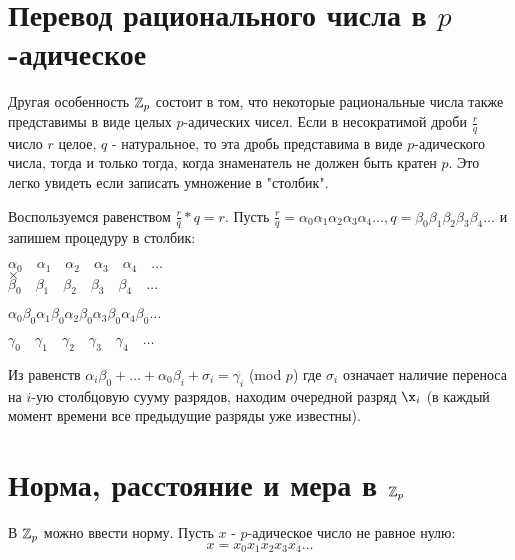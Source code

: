 \section{Перевод рационального числа в $p$-адическое} \label{sect1_4}

Другая особенность $\mathbb{Z}_p$ состоит в том, что некоторые рациональные числа также представимы в виде целых $p$-адических чисел. Если в несократимой дроби $\frac{r}{q}$ число $r$ целое, $q$ - натуральное, то эта дробь представима в виде $p$-адического числа, тогда и только тогда, когда знаменатель не должен быть кратен $p$. Это легко увидеть если записать умножение в "столбик". 

Воспользуемся равенством $\frac{r}{q} * q = r$. Пусть $\frac{r}{q} = \alpha_0 \alpha_1 \alpha_2 \alpha_3 \alpha_4 \ldots, q = \beta_0 \beta_1 \beta_2 \beta_3 \beta_4 \ldots$ и запишем процедуру в столбик:

\vspace{5mm}

$\alpha_0 \quad \alpha_1 \quad \alpha_2 \quad \alpha_3 \quad \alpha_4 \quad \ldots $\\
$\times$ \\

\underline{$ \beta_0 \quad \beta_1 \quad \beta_2 \quad \beta_3 \quad \beta_4 \quad \ldots$}

{$\alpha_0\beta_0 \alpha_1\beta_0 \alpha_2\beta_0 \alpha_3\beta_0 \alpha_4\beta_0 \ldots$ }

\quad\quad{$\alpha_0\beta_1 \alpha_1\beta_1 \alpha_2\beta_1 \alpha_3\beta_1 \ldots$ }

\underline{\quad\quad\quad\quad{$\alpha_0\beta_2 \alpha_1\beta_2 \alpha_2\beta_2 \ldots$ }}

{$\gamma_0 \quad \gamma_1 \quad \gamma_2 \quad \gamma_3 \quad \gamma_4 \quad \ldots$}


\vspace{5mm}

Из равенств $\alpha_i\beta_0 + \ldots + \alpha_0\beta_i + \sigma_i = \gamma_i$ (mod $p$) где $\sigma_i$ означает наличие переноса на $i$-ую столбцовую сууму разрядов, находим очередной разряд $\x_i$ (в каждый момент времени все предыдущие разряды уже известны).  


\section{Норма, расстояние и мера в $\mathbb{Z}_p$} \label{sect1_5}

В $\mathbb{Z}_p$ можно ввести норму.  Пусть $x$ - $p$-адическое число не равное нулю:  $$x=x_0 x_1 x_2 x_3 x_4 \ldots$$

